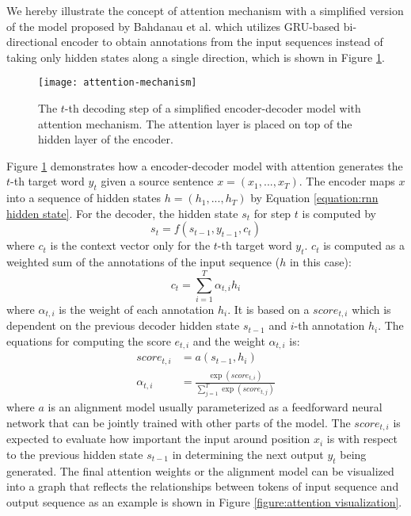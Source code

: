 We hereby illustrate the concept of attention mechanism with a simplified version of the model proposed by Bahdanau et al. \cite{Bahdanau2014} which utilizes GRU-based bi-directional encoder to obtain annotations from the input sequences instead of taking only hidden states along a single direction, which is shown in Figure \ref{figure:attention mechanism}.

\begin{figure}[h]
\texttt{[image: attention-mechanism]}
\centering
\caption{The $ t $-th decoding step of a simplified encoder-decoder model with attention mechanism. The attention layer is placed on top of the hidden layer of the encoder.}
\label{figure:attention mechanism}
\end{figure}

Figure \ref{figure:attention mechanism} demonstrates how a encoder-decoder model with attention generates the $ t $-th target word $ y_{t} $ given a source sentence $ x = (x_{1},...,x_{T}) $. The encoder maps $ x $ into a sequence of hidden states $ h = (h_{1},...,h_{T}) $ by Equation \ref{equation:rnn hidden state}. For the decoder, the hidden state $ s_{t} $ for step $ t $ is computed by
\[ s_{t} = f(s_{t-1}, y_{t-1}, c_{t}) \]
where $ c_{t} $ is the context vector only for the $ t $-th target word $ y_{t} $. $ c_{t} $ is computed as a weighted sum of the annotations of the input sequence ($ h $ in this case):
\[ c_{t} = \sum_{i=1}^{T}\alpha_{t,i}h_{i} \]
where $ \alpha_{t,i} $ is the weight of each annotation $ h_{i} $. It is based on a $ score_{t,i} $ which is dependent on the previous decoder hidden state $ s_{t-1} $ and $ i $-th annotation $ h_{i} $. The equations for computing the score $ e_{t,i} $ and the weight $ \alpha_{t,i} $ is:
\begin{align*}
score_{t,i} &= a(s_{t-1}, h_{i}) \\
\alpha_{t,i} &= \frac{\exp(score_{t,i})}{\sum_{j=1}^{T}\exp(score_{t,j})}
\end{align*} 
where $ a $ is an alignment model usually parameterized as a feedforward neural network that can be jointly trained with other parts of the model. The $ score_{t,i} $ is expected to evaluate how important the input around position $ x_{i} $ is with respect to the previous hidden state $ s_{t-1} $ in determining the next output $ y_{t} $ being generated. The final attention weights or the alignment model can be visualized into a graph that reflects the relationships between tokens of input sequence and output sequence as an example is shown in Figure \ref{figure:attention visualization}.

